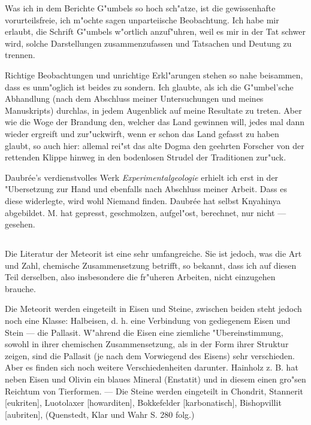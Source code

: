 \documentclass[a4paper, 11pt, oneside]{article}
\begin{document}
Was ich in dem Berichte G"umbels so hoch sch"atze, ist die gewissenhafte vorurteilsfreie, ich m"ochte sagen unparteiische Beobachtung. Ich habe mir erlaubt, die Schrift G"umbels w"ortlich anzuf"uhren, weil es mir in der Tat schwer wird, solche Darstellungen zusammenzufassen und Tatsachen und Deutung zu trennen.

Richtige Beobachtungen und unrichtige Erkl"arungen stehen so nahe beisammen, dass es unm"oglich ist beides zu sondern. Ich glaubte, als ich die G"umbel'sche Abhandlung (nach dem Abschluss meiner Untersuchungen und meines Manuskripts) durchlas, in jedem Augenblick auf meine Resultate zu treten. Aber wie die Woge der Brandung den, welcher das Land gewinnen will, jedes mal dann wieder ergreift und zur"uckwirft, wenn er schon das Land gefasst zu haben glaubt, so auch hier: allemal rei"st das alte Dogma den geehrten Forscher von der rettenden Klippe hinweg in den bodenlosen Strudel der Traditionen zur"uck.

Daubrée's verdienstvolles Werk \emph{Experimentalgeologie} erhielt ich erst in der "Ubersetzung zur Hand und ebenfalls nach Abschluss meiner Arbeit. Dass es diese widerlegte, wird wohl Niemand finden. Daubrée hat selbst Knyahinya abgebildet. M. hat gepresst, geschmolzen, aufgel"ost, berechnet, nur nicht --- gesehen.
\clearpage
\subsection{}
\paragraph{}
Die Literatur der Meteorit ist eine sehr umfangreiche. Sie ist jedoch, was die Art und Zahl, chemische Zusammensetzung betrifft, so bekannt, dass ich auf diesen Teil derselben, also insbesondere die fr"uheren Arbeiten, nicht einzugehen brauche.

Die Meteorit werden eingeteilt in Eisen und Steine, zwischen beiden steht jedoch noch eine Klasse: Halbeisen, d. h. eine Verbindung von gediegenem Eisen und Stein --- die Pallasit. W"ahrend die Eisen eine ziemliche "Ubereinstimmung, sowohl in ihrer chemischen Zusammensetzung, als in der Form ihrer Struktur zeigen, sind die Pallasit (je nach dem Vorwiegend des Eisens) sehr verschieden. Aber es finden sich noch weitere Verschiedenheiten darunter. Hainholz z. B. hat neben Eisen und Olivin ein blaues Mineral (Enstatit) und in diesem einen gro"sen Reichtum von Tierformen. --- Die Steine werden eingeteilt in Chondrit, Stannerit [eukriten], Luotolaxer [howarditen], Bokkefelder [karbonatisch], Bishopvillit [aubriten], (Quenstedt, Klar und Wahr S. 280 folg.)
\end{document}
